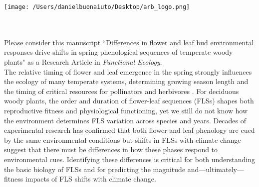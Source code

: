 \documentclass[11.75 pt]{article}\usepackage[]{graphicx}\usepackage[]{color}
\begin{document}

\def\labelitemi{--}
\parindent=24pt
\noindent\texttt{[image: /Users/danielbuonaiuto/Desktop/arb\_logo.png]}
\\\\
\\
\vspace{1.5ex}

\noindent Please consider this manuscript ``Differences in flower and leaf bud environmental responses drive shifts in spring phenological sequences of temperate woody plants" as a Research Article in \textit{Functional Ecology}.\\

\noindent The relative timing of flower and leaf emergence in the spring strongly influences the ecology of many temperate systems, determining growing season length and the timing of critical resources for pollinators and herbivores \citep{Li2016}. For deciduous woody plants, the order and duration of flower-leaf sequences (FLSs) shapes both reproductive fitness and physiological functioning, yet we still do not know how the environment determines FLS variation across species and years. Decades of experimental research has confirmed that both flower and leaf phenology are cued by the same environmental conditions \citep{Korner:2010aa} but shifts in FLSs with climate change suggest that there must be differences in how these phases respond to environmental cues. Identifying these differences is critical for both understanding the basic biology of FLSs and for predicting the magnitude and---ultimately---fitness impacts of FLS shifts with climate change.\\
\end{document}
